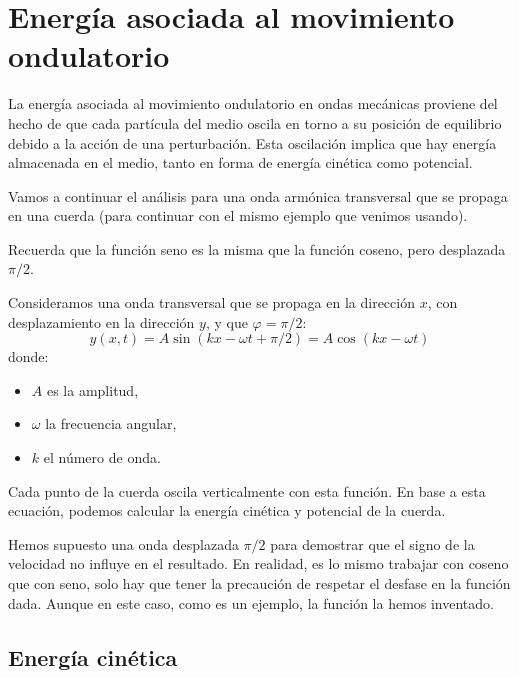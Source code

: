 \section{Energía asociada al movimiento ondulatorio}
\label{sec:wave_energy}

La energía asociada al movimiento ondulatorio en ondas mecánicas proviene del hecho de que cada partícula del medio oscila en torno a su posición de equilibrio debido a la acción de una perturbación. Esta oscilación implica que hay energía almacenada en el medio, tanto en forma de energía cinética como potencial.

Vamos a continuar el análisis para una onda armónica transversal que se propaga en una cuerda (para continuar con el mismo ejemplo que venimos usando). 

\begin{tcolorbox}[myconclusion]
  Recuerda que la función seno es la misma que la función coseno, pero desplazada \(\pi/2\).
\end{tcolorbox}

Consideramos una onda transversal que se propaga en la dirección \(x\), con desplazamiento en la dirección \(y\), y que \(\varphi = \pi/2\):
\[
y(x,t) = A \sin(kx - \omega t + \pi/2) = \boxed{A \cos(kx - \omega t)}
\]
donde:
\begin{itemize}
  \item \(A\) es la amplitud,
  \item \(\omega\) la frecuencia angular,
  \item \(k\) el número de onda.
\end{itemize}

Cada punto de la cuerda oscila verticalmente con esta función. En base a esta ecuación, podemos calcular la energía cinética y potencial de la cuerda.

\begin{tcolorbox}[myconclusion]
  Hemos supuesto una onda desplazada \(\pi/2\) para demostrar que el signo de la velocidad no influye en el resultado. En realidad, es lo mismo trabajar con coseno que con seno, solo hay que tener la precaución de respetar el desfase en la función dada. Aunque en este caso, como es un ejemplo, la función la hemos inventado.
\end{tcolorbox}

\subsection{Energía cinética}

